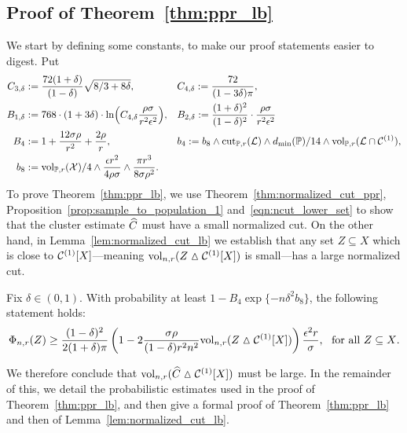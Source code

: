 \subsection{Proof of Theorem~\ref{thm:ppr_lb}}
We start by defining some constants, to make our proof statements easier to digest. Put
\begin{align*}
C_{3,\delta} & := \frac{72(1 + \delta)}{(1 - \delta)} \sqrt{8/3 + 8 \delta}
,&&C_{4,\delta} := \frac{72}{(1 - 3\delta)\pi}, \\
B_{1,\delta} & := 768 \cdot (1 + 3\delta) \cdot \ln\Bigl(C_{4,\delta} \frac{\rho\sigma}{r^2 \epsilon^2} \Bigr),&&B_{2,\delta} := \frac{(1 + \delta)^2}{(1 - \delta)^2} \cdot \frac{\rho \sigma}{r^2 \epsilon^2} \\
B_4 & := 1 + \frac{12\sigma\rho}{r^2} + \frac{2\rho}{r},&&b_4 :=  b_8 \wedge \mathrm{cut}_{\mathbb{P},r}(\mathcal{L}) \wedge d_{\min}(\mathbb{P})/14 \wedge \mathrm{vol}_{\mathbb{P},r}(\mathcal{L} \cap \mathcal{C}^{(1)}), \\
b_8 &:= \mathrm{vol}_{\mathbb{P},r}(\mathcal{X})/4 \wedge \frac{\epsilon r^2}{4\rho\sigma} \wedge \frac{\pi r^3}{8\sigma \rho^2}.
\end{align*}
To prove Theorem~\ref{thm:ppr_lb}, we use Theorem~\ref{thm:normalized_cut_ppr}, Proposition~\ref{prop:sample_to_population_1} and~\eqref{eqn:ncut_lower_set} to show that the cluster estimate $\widehat{C}$ must have a small normalized cut. On the other hand, in Lemma~\ref{lem:normalized_cut_lb} we establish that any set $Z \subseteq X$ which is close to $\mathcal{C}^{(1)}[X]$---meaning $\mathrm{vol}_{n,r}(Z \vartriangle \mathcal{C}^{(1)}[X])$ is small---has a large normalized cut.
\begin{lemma}
	\label{lem:normalized_cut_lb}
	Fix $\delta \in (0,1)$. With probability at least $1 - B_4\exp\{-n\delta^2b_8\}$, the following statement holds:
	\begin{equation}
	\label{eqn:normalized_cut_lb}
	\Phi_{n,r}(Z) \geq \frac{(1 - \delta)^2}{2(1 + \delta)\pi} \left(1 - 2 \frac{\sigma \rho}{(1 - \delta) r^2 n^2} \mathrm{vol}_{n,r}(Z \vartriangle \mathcal{C}^{(1)}[X]) \right) \frac{\epsilon^2 r}{\sigma},~~\textrm{for all $Z \subseteq X$}.
	\end{equation}
\end{lemma}
We therefore conclude that $\mathrm{vol}_{n,r}(\widehat{C} \vartriangle \mathcal{C}^{(1)}[X])$ must be large. In the remainder of this, we detail the probabilistic estimates used in the proof of Theorem~\ref{thm:ppr_lb}, and then give a formal proof of Theorem~\ref{thm:ppr_lb} and then of Lemma~\ref{lem:normalized_cut_lb}.

